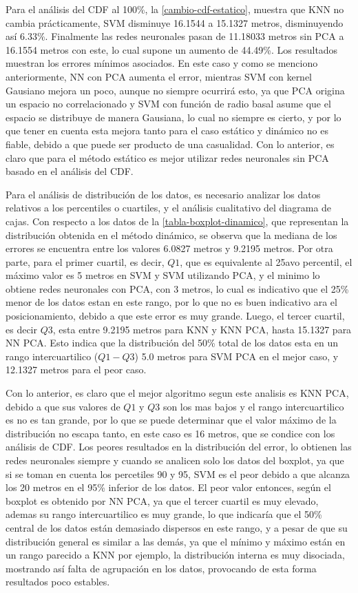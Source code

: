 Para el análisis del CDF al 100\%, la \autoref{cambio-cdf-estatico}, muestra que KNN no cambia prácticamente, SVM disminuye 16.1544 a 15.1327 metros, disminuyendo así 6.33\%. Finalmente las redes neuronales pasan de 11.18033 metros sin PCA a 16.1554 metros con este, lo cual supone un aumento de 44.49\%.  Los resultados muestran los errores mínimos asociados. En este caso y como se menciono anteriormente, NN con PCA aumenta el error, mientras SVM con kernel Gausiano mejora un poco, aunque no siempre ocurrirá esto, ya que PCA origina un espacio no correlacionado y SVM con función de radio basal asume que el espacio se distribuye de manera Gausiana, lo cual no siempre es cierto, y por lo que tener en cuenta esta mejora tanto para el caso estático y dinámico no es fiable, debido a que puede ser producto de una casualidad. Con lo anterior, es claro que para el método estático es mejor utilizar redes neuronales sin PCA basado en el análisis del CDF.

Para el análisis de distribución de los datos, es necesario analizar los datos relativos a los percentiles o cuartiles, y el análisis cualitativo del diagrama de cajas.  Con respecto a los datos de la \autoref{tabla-boxplot-dinamico}, que representan la distribución obtenida en el método dinámico, se observa que la mediana de los errores se encuentra entre los valores 6.0827 metros y 9.2195 metros. Por otra parte, para el primer cuartil, es decir, $Q1$, que es equivalente al 25avo percentil, el máximo valor es 5 metros en SVM y SVM utilizando PCA, y el minimo lo obtiene redes neuronales con PCA, con 3 metros, lo cual es indicativo que el 25\% menor de los datos estan en este rango, por lo que no es buen indicativo ara el posicionamiento, debido a que este error es muy grande. Luego, el tercer cuartil, es decir $Q3$,  esta entre 9.2195 metros para KNN y KNN PCA, hasta 15.1327 para NN PCA. Esto indica que la distribución del 50\% total de los datos esta en un rango intercuartilico ($Q1 - Q3$) 5.0 metros para SVM PCA en el mejor caso, y 12.1327 metros para el peor caso. 

Con lo anterior, es claro que el mejor algoritmo segun este analisis es KNN PCA, debido a que sus valores de $Q1$ y $Q3$ son los mas bajos y el rango intercuartilico es no es tan grande, por lo que se puede determinar que el valor máximo de la distribución no escapa tanto, en este caso es 16 metros, que se condice con los análisis de CDF. Los peores resultados en la distribución del error, lo obtienen las redes neuronales siempre y cuando se analicen solo los datos del boxplot, ya que si se toman en cuenta los percetiles 90 y 95, SVM es el peor debido a que alcanza los 20 metros en el 95\% inferior de los datos. El peor valor entonces, según el boxplot es obtenido por NN PCA, ya que el tercer cuartil es muy elevado, ademas su rango intercuartilico es muy grande, lo que indicaría que el 50\% central de los datos están demasiado dispersos en este rango, y a pesar de que su distribución general es similar a las demás, ya que el mínimo y máximo están en un rango parecido a KNN por ejemplo, la distribución interna es muy disociada, mostrando así falta de agrupación en los datos, provocando de esta forma resultados poco estables.

